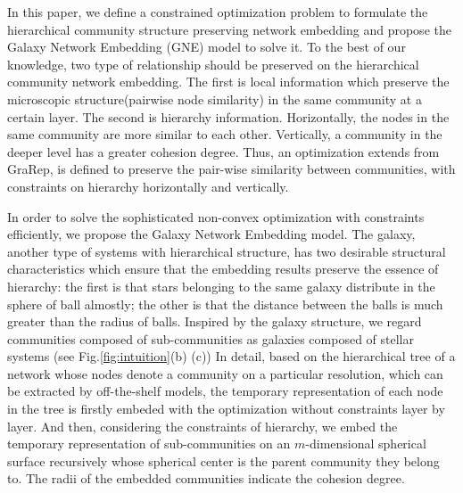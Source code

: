 \documentclass{article}
\theoremstyle{definition}
\begin{document}

		In this paper, we define a constrained optimization problem to formulate the hierarchical community structure preserving network embedding and propose the Galaxy Network Embedding (GNE) model to solve it. To the best of our knowledge, two type of relationship should be preserved on the hierarchical community network embedding. The first is local information which preserve the microscopic structure(pairwise node similarity) in the same community at a certain layer. The second is hierarchy information. Horizontally, the nodes in the same community are more similar to each other. Vertically, a community in the deeper level has a greater cohesion degree. Thus, an optimization extends from GraRep\cite{Cao2015GraRep}, is defined to preserve the pair-wise similarity between communities, with constraints on hierarchy horizontally and vertically. 

		In order to solve the sophisticated non-convex optimization with constraints efficiently, we propose the Galaxy Network Embedding model. The galaxy, another type of systems with hierarchical structure, has two desirable structural characteristics which ensure that the embedding results preserve the essence of hierarchy: the first is that stars belonging to the same galaxy distribute in the sphere of ball almostly; the other is that the distance between the balls is much greater than the radius of balls. Inspired by the galaxy structure, we regard communities composed of sub-communities as galaxies composed of stellar systems (see Fig.\ref{fig:intuition}(b) (c)) 
		In detail, based on the hierarchical tree of a network whose nodes denote a community on a particular resolution, which can be extracted by off-the-shelf models, the temporary representation of each node in the tree is firstly embeded with the optimization without constraints layer by layer. And then, considering the constraints of hierarchy, we embed the temporary representation of sub-communities on an $m$-dimensional spherical surface recursively whose spherical center is the parent community they belong to. The radii of the embedded communities indicate the cohesion degree.
		
\end{document}
